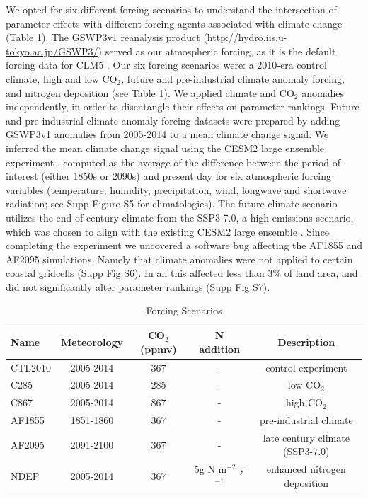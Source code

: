 \documentclass[draft]{agujournal2019}
\begin{document}
 We opted for six different forcing scenarios to understand the intersection of parameter effects with different forcing agents associated with climate change (Table \ref{tab:exps}). The GSWP3v1 reanalysis product (\url{http://hydro.iis.u-tokyo.ac.jp/GSWP3/}) served as our atmospheric forcing, as it is the default forcing data for CLM5 \cite{lawrence2019}. Our six forcing scenarios were: a 2010-era control climate, high and low CO$_2$, future and pre-industrial climate anomaly forcing, and  nitrogen deposition (see Table \ref{tab:exps}).  We applied climate and CO$_2$ anomalies independently, in order to disentangle their effects on parameter rankings. Future and pre-industrial climate anomaly forcing datasets were prepared by adding GSWP3v1 anomalies from 2005-2014 to a mean climate change signal. We inferred the mean climate change signal using the CESM2 large ensemble experiment \cite{rodgers2021}, computed as the average of the difference between the period of interest (either 1850s or 2090s) and present day for six atmospheric forcing variables (temperature, humidity, precipitation, wind, longwave and shortwave radiation; see Supp Figure S5 for climatologies). The future climate scenario utilizes the end-of-century climate from the SSP3-7.0, a high-emissions scenario, which was chosen to align with the existing CESM2 large ensemble \cite{rodgers2021}. Since completing the experiment we uncovered a software bug affecting the AF1855 and AF2095 simulations. Namely that climate anomalies were not applied to certain coastal gridcells (Supp Fig S6). In all this affected less than 3\% of land area, and did not significantly alter parameter rankings (Supp Fig S7).  


 

\label{sect:exps}
 \begin{table}[h]
 \caption{Forcing Scenarios}
 \centering
 \begin{tabular}{l c c c c}
 \hline
  Name  & Meteorology & CO$_2$ (ppmv) & N addition & Description \\
 \hline
   CTL2010  & 2005-2014 & 367 & - & control experiment\\
   C285        & 2005-2014 & 285 & - & low CO$_2$ \\
   C867        & 2005-2014 & 867 & - & high CO$_2$ \\
   AF1855    & 1851-1860 & 367 & - & pre-industrial climate \\
   AF2095    & 2091-2100 & 367 & - & late century climate (SSP3-7.0) \\
   NDEP      & 2005-2014 & 367 & 5g N m$^{-2}$  y$^{-1}$ & enhanced nitrogen deposition \\
 \hline
 \end{tabular}
 \label{tab:exps}
 \end{table}
\end{document}
